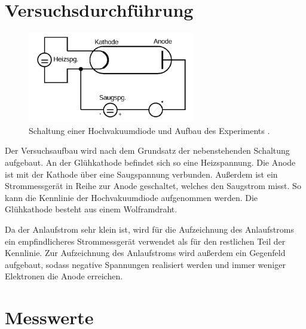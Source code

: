 %

%
\section{Versuchsdurchführung}

\begin{minipage}[t]{1\textwidth}
    \begin{figure}
        \vspace{-15pt}
        \begin{center}
            \includegraphics[width=0.65\textwidth]{content/Schaltung.png}
            \caption{Schaltung einer Hochvakuumdiode und Aufbau des Experiments \cite{Versuchsanleitung_v504}.}
        \end{center}
    \end{figure}
    Der Versuchsaufbau wird nach dem Grundsatz der nebenstehenden Schaltung aufgebaut. An der Glühkathode 
    befindet sich so eine Heizspannung. Die Anode ist mit der Kathode über eine Saugspannung verbunden. 
    Außerdem ist ein Strommessgerät in Reihe zur Anode geschaltet, welches den Saugstrom misst. So kann 
    die Kennlinie der Hochvakuumdiode aufgenommen werden. Die Glühkathode besteht aus einem Wolframdraht. \\
\end{minipage}
\noindent Da der Anlaufstrom sehr klein ist, wird für die Aufzeichnung des Anlaufstroms ein empfindlicheres 
Strommessgerät verwendet als für den restlichen Teil der Kennlinie.
Zur Aufzeichnung des Anlaufstroms wird außerdem ein Gegenfeld aufgebaut, sodass negative Spannungen 
realisiert werden und immer weniger Elektronen die Anode erreichen. 

\newpage

\section{Messwerte}
\label{sec:Messwerte}

